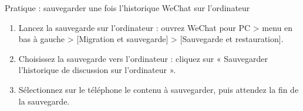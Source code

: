 \begin{tcbpractice}{Pratique : sauvegarder une fois l'historique WeChat sur l'ordinateur}
\begin{enumerate}
  \item Lancez la sauvegarde sur l'ordinateur : ouvrez WeChat pour PC > menu en bas à gauche > [Migration et sauvegarde] > [Sauvegarde et restauration].
  \item Choisissez la sauvegarde vers l'ordinateur : cliquez sur « Sauvegarder l'historique de discussion sur l'ordinateur ».
  \item Sélectionnez sur le téléphone le contenu à sauvegarder, puis attendez la fin de la sauvegarde.
\end{enumerate}

\end{tcbpractice}
